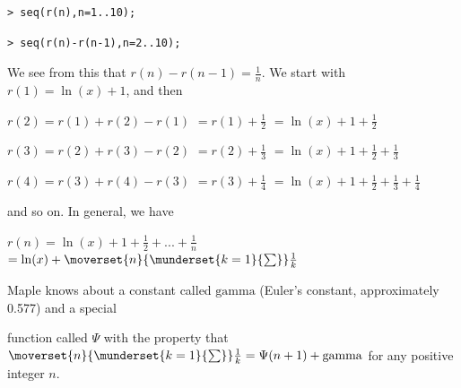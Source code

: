 \documentclass{article}
\begin{document}
\begin{lstlisting}
> seq(r(n),n=1..10);
\end{lstlisting}
\begin{lstlisting}
> seq(r(n)-r(n-1),n=2..10);
\end{lstlisting}
\begin{Maple Normal}
We see from this that 
$r (n)-r (n -1)=\frac{1}{n}$.  We start with 
$r (1)=\ln (x)+1$, and then
\end{Maple Normal}
\begin{Maple Normal}
     
$r (2)=r (1)+r (2)-r (1)$
$=r (1)+\frac{1}{2}$
$=\ln (x)+1+\frac{1}{2}$
\end{Maple Normal}
\begin{Maple Normal}
     
$r (3)=r (2)+r (3)-r (2)$
$=r (2)+\frac{1}{3}$
$=\ln (x)+1+\frac{1}{2}+\frac{1}{3}$
\end{Maple Normal}
\begin{Maple Normal}
     
$r (4)=r (3)+r (4)-r (3)$
$=r (3)+\frac{1}{4}$
$=\ln (x)+1+\frac{1}{2}+\frac{1}{3}+\frac{1}{4}$
\end{Maple Normal}
\begin{Maple Normal}

\end{Maple Normal}
\begin{Maple Normal}
and so on.  In general, we have
\end{Maple Normal}
\begin{Maple Normal}

\end{Maple Normal}
\begin{center}

$r (n)=\ln (x)+1+\frac{1}{2}+\mathit{...} +\frac{1}{n}$
$=\ln (x)+\moverset{n}{\munderset{k =1}{\sum}}\frac{1}{k}$\end{center}
\begin{Maple Normal}

\end{Maple Normal}
\begin{Maple Normal}
Maple knows about a constant called 
$\mathrm{gamma}$ (Euler's constant, approximately 0.577) and a special 
\end{Maple Normal}
\begin{Maple Normal}
function called 
$\Psi$ with the property that 
$\moverset{n}{\munderset{k =1}{\sum}}\frac{1}{k}=\Psi (n +1)+\mathrm{gamma}$ for any positive integer 
$n$.
\end{Maple Normal}
\end{document}
